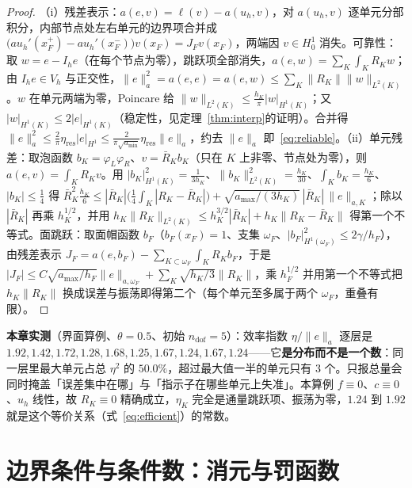 \begin{proof}
（i）残差表示：$a(e,v)=\ell(v)-a(u_h,v)$，对 $a(u_h,v)$ 逐单元分部积分，内部节点处左右单元的边界项合并成
$\bigl(au_h'(x_F^+)-au_h'(x_F^-)\bigr)v(x_F)=J_Fv(x_F)$，两端因 $v\in H^1_0$ 消失。可靠性：取
$w=e-I_he$（在每个节点为零），跳跃项全部消失，$a(e,w)=\sum_K\int_KR_Kw$；由 $I_he\in V_h$
与正交性，$\|e\|_a^2=a(e,e)=a(e,w)\le\sum_K\|R_K\|\|w\|_{L^2(K)}$。$w$ 在单元两端为零，Poincare 给
$\|w\|_{L^2(K)}\le\frac{h_K}{\pi}|w|_{H^1(K)}$；又
$|w|_{H^1(K)}\le2|e|_{H^1(K)}$（稳定性，见定理~\ref{thm:interp}的证明）。合并得
$\|e\|_a^2\le\frac2\pi\eta_{\text{res}}|e|_{H^1}\le\frac{2}{\pi\sqrt{a_{\min}}}\eta_{\text{res}}\|e\|_a$，约去
$\|e\|_a$ 即~\eqref{eq:reliable}。（ii）单元残差：取泡函数 $b_K=\varphi_L\varphi_R$、$v=\bar R_Kb_K$（只在 $K$
上非零、节点处为零），则 $a(e,v)=\int_KR_Kv$。用
$|b_K|^2_{H^1(K)}=\frac1{3h_K}$、$\|b_K\|^2_{L^2(K)}=\frac{h_K}{30}$、$\int_Kb_K=\frac{h_K}6$、$|b_K|\le\frac14$
得 $\bar R_K^2\frac{h_K}6\le|\bar R_K|\bigl(\frac14\int_K|R_K-\bar
R_K|\bigr)+\sqrt{a_{\max}/(3h_K)}\,|\bar R_K|\,\|e\|_{a,K}$；除以 $|\bar R_K|$ 再乘 $h_K^{1/2}$，并用
$h_K\|R_K\|_{L^2(K)}\le h_K^{3/2}|\bar R_K|+h_K\|R_K-\bar R_K\|$ 得第一个不等式。面跳跃：取面帽函数
$b_F$（$b_F(x_F)=1$、支集 $\omega_F$、$|b_F|^2_{H^1(\omega_F)}\le2\gamma/h_F$），由残差表示
$J_F=a(e,b_F)-\sum_{K\subset\omega_F}\int_KR_Kb_F$，于是 $|J_F|\le
C\sqrt{a_{\max}/h_F}\|e\|_{a,\omega_F}+\sum_K\sqrt{h_K/3}\|R_K\|$，乘 $h_F^{1/2}$ 并用第一个不等式把
$h_K\|R_K\|$ 换成误差与振荡即得第二个（每个单元至多属于两个 $\omega_F$，重叠有限）。
\end{proof}

\textbf{本章实测}（界面算例、$\theta=0.5$、初始 $n_{\text{dof}}=5$）：效率指数 $\eta/\|e\|_a$ 逐层是
$1.92,1.42,1.72,1.28,1.68,1.25,1.67,1.24,1.67,1.24$——它\textbf{是分布而不是一个数}：同一层里最大单元占总 $\eta^2$ 的
$50.0\%$，超过最大值一半的单元只有 $3$ 个。只报总量会同时掩盖「误差集中在哪」与「指示子在哪些单元上失准」。本算例 $f\equiv0$、$c\equiv0$、$u_h$ 线性，故
$R_K\equiv0$ 精确成立，$\eta_K$ 完全是通量跳跃项、振荡为零，$1.24$ 到 $1.92$ 就是这个等价关系（式~\eqref{eq:efficient}）的常数。

\section{边界条件与条件数：消元与罚函数}

